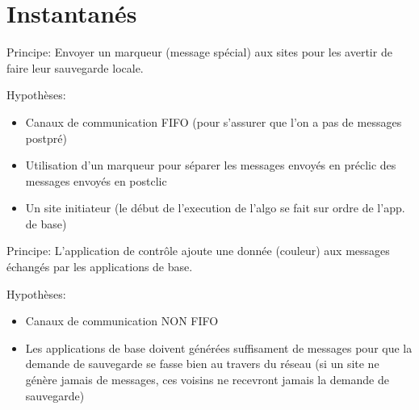 \documentclass[a4paper,11pt]{article}
\begin{document}
\newpage
\section{Instantanés}

Principe: Envoyer un marqueur (message spécial) aux sites pour les avertir de faire leur sauvegarde locale.

Hypothèses:
\begin{itemize}
    \item Canaux de communication FIFO (pour s'assurer que l'on a pas de messages postpré)
    \item Utilisation d'un marqueur pour séparer les messages envoyés en préclic des messages envoyés en postclic
    \item Un site initiateur (le début de l'execution de l'algo se fait sur ordre de l'app. de base)
\end{itemize}



Principe: L'application de contrôle ajoute une donnée (couleur) aux messages échangés par les applications de base.

Hypothèses:
\begin{itemize}
    \item Canaux de communication NON FIFO
    \item Les applications de base doivent générées suffisament de messages pour que la demande de sauvegarde se fasse bien au travers du réseau (si un site ne génère jamais de messages, ces voisins ne recevront jamais la demande de sauvegarde)
\end{itemize}
\end{document}
